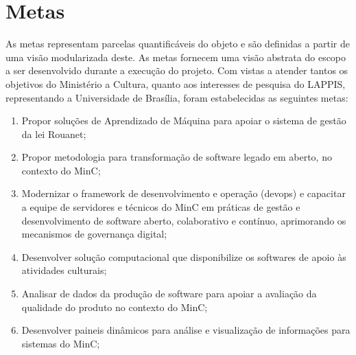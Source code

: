 \section{Metas}
\label{metas}
As metas representam parcelas quantificáveis do objeto e são definidas a partir de uma visão modularizada deste.
As metas fornecem uma visão abstrata do escopo a ser desenvolvido durante a execução do projeto. 
Com vistas a atender tantos os objetivos do Ministério a Cultura,
quanto aos interesses de pesquisa do LAPPIS, representando a Universidade de Brasília, foram estabelecidas as seguintes metas:

\begin{enumerate}
\item Propor soluções de Aprendizado de Máquina para apoiar o sistema de gestão da lei Rouanet;
\item Propor metodologia para transformação de software legado em aberto, no contexto do MinC;
\item Modernizar o framework de desenvolvimento e operação (devops) e capacitar a equipe de servidores e técnicos do MinC em práticas de gestão e desenvolvimento de 
software aberto, colaborativo e contínuo, aprimorando os mecanismos de governança digital; %
\item Desenvolver solução computacional que disponibilize os softwares de apoio às atividades culturais;
\item Analisar de dados da produção de software para apoiar a avaliação da qualidade do produto no contexto do MinC;
\item Desenvolver paineis dinâmicos para análise e visualização de informações para sistemas do MinC; 
\end{enumerate}

